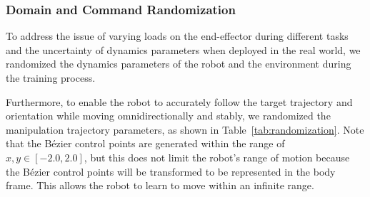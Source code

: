 \begin{table}[]
\begin{tabular}{ccc}
    \bottomrule
    \end{tabular}%
    \label{tab:controller-reward}%
    \vspace{-.1in}
\end{table}%


\subsubsection{Domain and Command Randomization}
To address the issue of varying loads on the end-effector during different tasks and the uncertainty of dynamics parameters when deployed in the real world, we randomized the dynamics parameters of the robot and the environment during the training process.

Furthermore, to enable the robot to accurately follow the target trajectory and orientation while moving omnidirectionally and stably, we randomized the manipulation trajectory parameters, as shown in Table~\ref{tab:randomization}.
Note that the Bézier control points are generated within the range of $x,y \in [-2.0, 2.0]$, but this does not limit the robot's range of motion because the Bézier control points will be transformed to be represented in the body frame. This allows the robot to learn to move within an infinite range.

